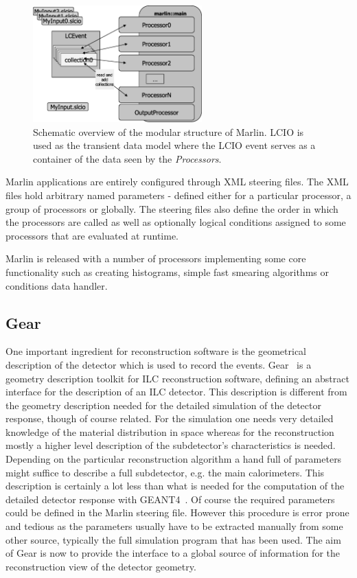 \begin{figure}[htb]
\centering
\includegraphics*[width=65mm,angle=0]{marlin.eps}
\caption{
Schematic overview of the modular structure of Marlin. LCIO is used as the 
transient data model where the LCIO event serves as a
container of the data seen by the {\em Processors}.
}
\label{fig_marlin}
\end{figure}

Marlin applications are entirely configured through XML steering files.
The XML files hold arbitrary named parameters - defined
either for a particular processor, a group of processors or globally. The
steering files also define the order in which the
processors are called as well as optionally logical conditions assigned to
some processors that are evaluated at runtime. 

Marlin is released with a number of processors implementing some core
functionality such as creating histograms,
simple fast smearing algorithms or conditions data handler.

\subsection{Gear}

One important ingredient for reconstruction software is the geometrical
description of the detector which is used to record the events. 
Gear~\cite{ref_gear} is a geometry description toolkit for ILC reconstruction software, 
defining an abstract interface for the description of an ILC detector.
This description is different from the geometry description needed for the 
detailed simulation of the detector response, though of course related. For the
simulation one needs very detailed knowledge of the material
distribution in space whereas for the reconstruction mostly a higher
level description of the subdetector's characteristics is needed.
Depending on the particular reconstruction algorithm a hand full of
parameters might suffice to describe a full subdetector, e.g. the main
calorimeters.  
This description is certainly a lot less than what is needed for the
computation of the detailed detector response with GEANT4~\cite{ref_geant4}. 
Of course the required parameters could be defined in the Marlin steering 
file. However this procedure is error prone and tedious as the parameters 
usually have to be extracted manually 
from some other source, typically the full simulation
program that has been used. 
The aim of Gear is now to provide the interface to a 
global source of information for the reconstruction view of the
detector geometry.

